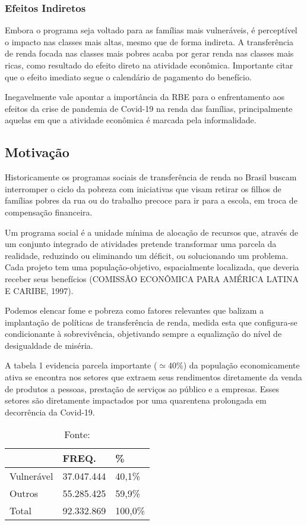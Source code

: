 \subsubsection{Efeitos Indiretos}

Embora o programa seja voltado para as famílias mais vulneráveis, é perceptível o impacto nas classes mais altas, mesmo que de forma indireta. A transferência de renda focada nas classes mais pobres acaba por gerar renda nas classes mais ricas, como resultado do efeito direto na atividade econômica. Importante citar que o efeito imediato segue o calendário de pagamento do benefício.


Inegavelmente vale apontar a importância da RBE para o enfrentamento aos efeitos da crise de pandemia de Covid-19 na renda das famílias, principalmente aquelas em que a atividade econômica é marcada pela informalidade.

 \subsection{Motivação}

 Historicamente os programas sociais de transferência de renda no Brasil buscam interromper o ciclo da pobreza com iniciativas que visam retirar os filhos de famílias pobres da rua ou do trabalho precoce para ir para a escola, em troca de compensação financeira.

 Um programa social é a unidade mínima de alocação de recursos que, através de um conjunto integrado de atividades pretende transformar uma parcela da realidade, reduzindo ou eliminando um déficit, ou solucionando um problema. Cada projeto tem uma população-objetivo, espacialmente localizada, que deveria receber seus benefícios (COMISSÃO ECONÔMICA PARA AMÉRICA LATINA E CARIBE, 1997).
 
 Podemos elencar fome e pobreza como fatores relevantes que balizam a implantação de políticas de transferência de renda, medida esta que configura-se condicionante à sobrevivência, objetivando sempre a equalização do nível de desigualdade de miséria.
 
 A tabela 1 evidencia parcela importante ($\simeq 40\%$) da população economicamente ativa se encontra nos setores que extraem seus rendimentos diretamente da venda de produtos a pessoas, prestação de serviços ao público e a empresas. Esses setores são diretamente impactados por uma quarentena prolongada em decorrência da Covid-19.


\begin{table}[ht]
\centering
\begin{tabular}{lll}
\hline
           & FREQ.      & \%      \\
\hline
Vulnerável & 37.047.444 & 40,1\%  \\
Outros     & 55.285.425 & 59,9\%  \\
\hline
Total      & 92.332.869 & 100,0\%
\end{tabular}
\caption[fonte]{Fonte: \cite{kawaoka}}
\end{table}

